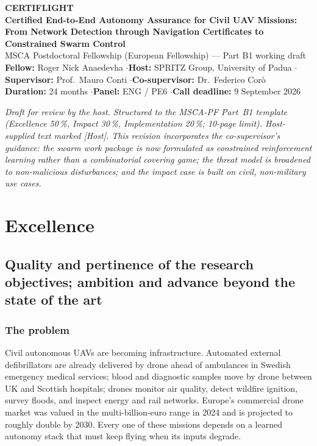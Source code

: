 \documentclass[11pt,a4paper]{article}
\begin{document}
\begin{center}
{\large\bfseries\color{DeepBlue} CERTIFLIGHT}\\[0.15em]
{\bfseries\color{AccentBlue} Certified End-to-End Autonomy Assurance for Civil UAV Missions:\\
From Network Detection through Navigation Certificates to Constrained Swarm Control}\\[0.35em]
{\footnotesize MSCA Postdoctoral Fellowship (European Fellowship) --- Part B1 working draft\\
\textbf{Fellow:} Roger Nick Anaedevha \quad$\cdot$\quad \textbf{Host:} SPRITZ Group, University of Padua \quad$\cdot$\quad
\textbf{Supervisor:} Prof.\ Mauro Conti \quad$\cdot$\quad \textbf{Co-supervisor:} Dr.\ Federico Cor\`o\\
\textbf{Duration:} 24 months \quad$\cdot$\quad \textbf{Panel:} ENG / PE6 \quad$\cdot$\quad \textbf{Call deadline:} 9 September 2026}
\end{center}

\vspace{-0.2em}
{\footnotesize\itshape Draft for review by the host. Structured to the MSCA-PF Part~B1 template (Excellence 50\,\%, Impact 30\,\%, Implementation 20\,\%; 10-page limit). Host-supplied text marked [Host]. This revision incorporates the co-supervisor's guidance: the swarm work package is now formulated as \emph{constrained reinforcement learning} rather than a combinatorial covering game; the threat model is broadened to non-malicious disturbances; and the impact case is built on civil, non-military use cases.}

\section{Excellence}

\subsection{Quality and pertinence of the research objectives; ambition and advance beyond the state of the art}

\subsubsection{The problem}
Civil autonomous UAVs are becoming infrastructure. Automated external defibrillators are already delivered by drone ahead of ambulances in Swedish emergency medical services; blood and diagnostic samples move by drone between UK and Scottish hospitals; drones monitor air quality, detect wildfire ignition, survey floods, and inspect energy and rail networks. Europe's commercial drone market was valued in the multi-billion-euro range in 2024 and is projected to roughly double by 2030. Every one of these missions depends on a learned autonomy stack that must keep flying when its inputs degrade.
\end{document}
